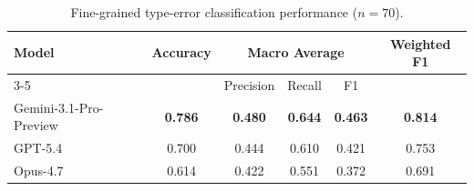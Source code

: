 \begin{table}[t]
    \centering
    \caption{Fine-grained type-error classification performance ($n=70$).}
    \label{tab:fine_grained_classification}
    \small
    \setlength{\tabcolsep}{9pt}
    \begin{tabular}{lccccc}
        \toprule
        \multirow{2}{*}{Model}
        & \multirow{2}{*}{Accuracy}
        & \multicolumn{3}{c}{Macro Average}
        & \multirow{2}{*}{Weighted F1} \\
        \cmidrule(lr){3-5}
        & & Precision & Recall & F1 & \\
        \midrule
        Gemini-3.1-Pro-Preview
        & \textbf{0.786}
        & \textbf{0.480}
        & \textbf{0.644}
        & \textbf{0.463}
        & \textbf{0.814} \\

        GPT-5.4
        & 0.700
        & 0.444
        & 0.610
        & 0.421
        & 0.753 \\

        Opus-4.7
        & 0.614
        & 0.422
        & 0.551
        & 0.372
        & 0.691 \\
        \bottomrule
    \end{tabular}
\end{table}

